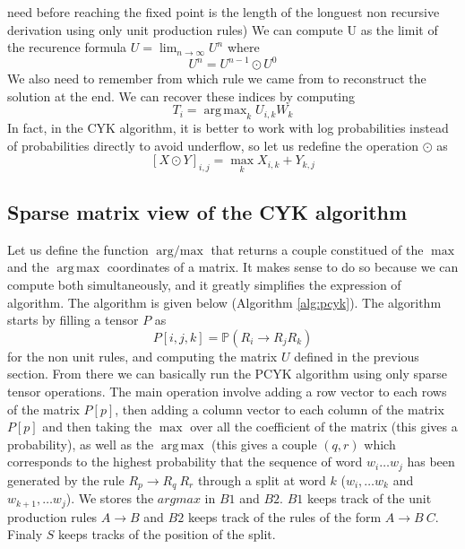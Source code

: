 \documentclass[a4paper, 11pt]{article}
\DeclareMathOperator*{\argmax}{arg\,max}
\DeclareMathOperator*{\argandmax}{arg/max}
\begin{document}
need before reaching the fixed point is the length of the longuest non
recursive derivation using only unit production rules) We can compute
U as the limit of the recurence formula
$U = \lim_{n \to \infty} U^{n}$ where
\begin{displaymath}
  U^n = U^{n-1} \odot U^0
\end{displaymath}
We also need to remember from which rule we came from to reconstruct the
solution at the end. We can recover these indices by computing
\begin{displaymath}
  T_{i} = \argmax_k{  U_{i,k} W_k }
\end{displaymath}
In fact, in the CYK algorithm, it is better to work with log
probabilities instead of probabilities directly to avoid underflow,
so let us redefine the operation $\odot$ as
\begin{displaymath}
  \left[ X \odot Y \right]_{i,j} = \max_k X_{i,k} + Y_{k, j}
\end{displaymath}

\subsection{Sparse matrix view of the CYK algorithm}

Let us define the function $\argandmax$ that returns a couple
constitued of the $\max$ and the $\argmax$ coordinates of a matrix. It
makes sense to do so because we can compute both simultaneously, and
it greatly simplifies the expression of algorithm. The algorithm is
given below (Algorithm \ref{alg:pcyk}).
The algorithm starts by filling a tensor $P$ as
\begin{displaymath}
  P[i, j, k] = \mathbb{P}(R_i \to R_j R_k)
\end{displaymath}
for the non unit rules, and computing the matrix $U$ defined in the
previous section. From there we can basically run the PCYK algorithm
using only sparse tensor operations. The main operation involve adding
a row vector to each rows of the matrix $P[p]$, then adding a column
vector to each column of the matrix $P[p]$ and then taking the $\max$
over all the coefficient of the matrix (this gives a probability), as
well as the $\argmax$ (this gives a couple $(q, r)$ which corresponds
to the highest probability that the sequence of word $w_i \dots w_j$
has been generated by the rule $R_p \to R_q\ R_r$ through a split at
word $k$ ($w_i, \dots w_k$ and $w_{k+1}, \dots w_j$). We stores the
$argmax$ in $B1$ and $B2$. $B1$ keeps track of the unit production
rules $A \to B$ and $B2$ keeps track of the rules of the form
$A \to B\ C$. Finaly $S$ keeps tracks of the position of the split.
\end{document}
